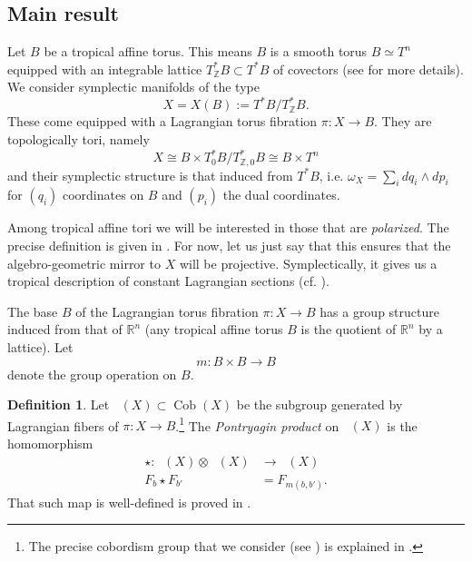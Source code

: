 \documentclass[10pt]{amsart}
\theoremstyle{definition}
\newtheorem{definition}[thm]{Definition}
\theoremstyle{remark}
\def\R{\mathbb{R}}
\def\Z{\mathbb{Z}}
\DeclareMathOperator{\Cob}{Cob}
\DeclareMathOperator{\Cobfib}{\mathrm{Cob}_{\mathrm{fib}}}
\def\x{\times}
\begin{document}
  \subsection{Main result}
Let $B$ be a tropical affine torus. 
This means $B$ is a smooth torus $B \simeq T^n$ equipped with an integrable lattice $T^*_\Z B \subset T^*B$ of covectors (see  for more details).
We consider symplectic manifolds of the type
\begin{equation}\label{eq:BgivesX(B)}
    X = X(B) := T^* B / T^*_\Z B.
\end{equation}
These come equipped with a Lagrangian torus fibration $\pi: X \to B$.
They are topologically tori, namely
\begin{equation}
    X \cong B \x T^*_0 B / T^*_{\Z,0} B \cong B \x T^n
\end{equation}
and their symplectic structure is that induced from $T^*B$, i.e. $\omega_X = \sum_i dq_i \wedge dp_i$ for $(q_i)$ coordinates on $B$ and $(p_i)$ the dual coordinates.

Among tropical affine tori we will be interested in those that are \emph{polarized}.
The precise definition is given in . 
For now, let us just say that this ensures that the algebro-geometric mirror to $X$ will be projective. 
Symplectically, it gives us a tropical description of constant Lagrangian sections (cf. ).

The base $B$ of the Lagrangian torus fibration $\pi: X \to B$ has a group structure induced from that of $\R^n$ (any tropical affine torus $B$ is the quotient of $\R^n$ by a lattice).
Let
\begin{equation*}
    m: B \x B \to B
\end{equation*}
denote the group operation on $B$.
\begin{definition}\label{def:pontryagin_intro}
    Let $\Cobfib(X) \subset \Cob(X)$ be the subgroup generated by Lagrangian fibers of $\pi: X \to B$.\footnote{The precise cobordism group that we consider (see ) is explained in .}
    The \emph{Pontryagin product} on $\Cobfib(X)$ is the homomorphism
    \begin{align*}
        \star: \Cobfib(X) \otimes \Cobfib(X) &\to \Cobfib(X) \\
        F_b\star F_{b'} &= F_{m(b,b')}.
    \end{align*}
    That such map is well-defined is proved in .
\end{definition}
\end{document}
